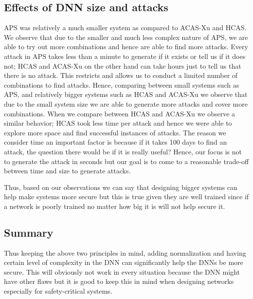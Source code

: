 \subsection{Effects of DNN size and attacks}
\ac{APS} was relatively a much smaller system as compared to \ac{ACAS-Xu} and \ac{HCAS}.
We observe that due to the smaller and much less complex nature of \ac{APS}, we are able to try out more combinations and hence are able to find more attacks. 
Every attack in \ac{APS} takes less than a minute to generate if it exists or tell us if it does not; \ac{HCAS} and \ac{ACAS-Xu} on the other hand can take hours just to tell us that there is no attack. 
This restricts and allows us to conduct a limited number of combinations to find attacks. 
Hence, comparing between small systems such as \ac{APS}, and relatively bigger systems such as \ac{HCAS} and \ac{ACAS-Xu} we observe that due to the small system size we are able to generate more attacks and cover more combinations. 
When we compare between \ac{HCAS} and \ac{ACAS-Xu} we observe a similar behavior; \ac{HCAS} took less time per attack and hence we were able to explore more space and find successful instances of attacks. 
The reason we consider time an important factor is because if it takes 100 days to find an attack, the question there would be if it is really useful?
Hence, our focus is not to generate the attack in seconds but our goal is to come to a reasonable trade-off between time and size to generate attacks. 

Thus, based on our observations we can say that designing bigger systems can help make systems more secure but this is true given they are well trained since if a network is poorly trained no matter how big it is will not help secure it. 




\subsection{Summary}
Thus keeping the above two principles in mind, adding normalization and having certain level of complexity in the \ac{DNN} can significantly help the \ac{DNN}s be more secure. 
This will obviously not work in every situation because the \ac{DNN} might have other flaws but it is good to keep this in mind when designing networks especially for safety-critical systems. 

